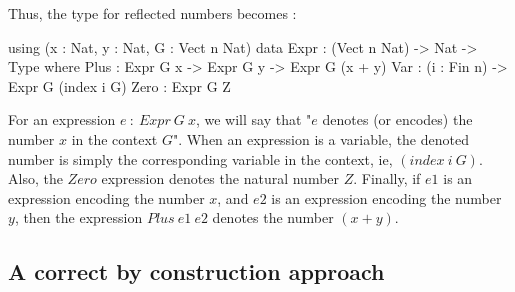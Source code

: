 \documentclass{sigplanconf}
\begin{document}
Thus, the type for reflected numbers becomes :
\begin{code}[caption=Second version of reflected number with embedded denotation, captionpos=b, label=lst1:haskell2]
using (x : Nat, y : Nat, G : Vect n Nat)
  data Expr : (Vect n Nat) -> Nat 
               -> Type where
       Plus : Expr G x -> Expr G y -> 
              Expr G (x + y)
       Var  : (i : Fin n) -> 
              Expr G (index i G)
       Zero : Expr G Z
\end{code}
For an expression $e\ :\ Expr\ G\ x$, we will say that "$e$ denotes (or encodes) the number $x$ in the context $G$".
When an expression is a variable, the denoted number is simply the corresponding variable in the context, ie, $(index\ i\ G)$.
Also, the $Zero$ expression denotes the natural number $Z$.
Finally, if $e1$ is an expression encoding the number $x$, and $e2$ is an expression encoding the number $y$, then the expression $Plus\ e1\ e2$ denotes the number $(x + y)$.

\subsection{A correct by construction approach}
\end{document}
